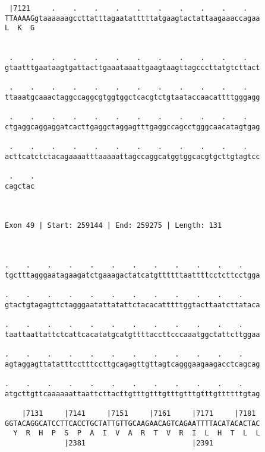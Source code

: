 \documentclass{article}
\begin{document}
\begin{Verbatim}
 |7121     .    .    .    .    .    .    .    .    .    .   
TTAAAAGgtaaaaaagccttatttagaatatttttatgaagtactattaagaaaccagaa
L  K  G                                                     
                                                            
  
 .    .    .    .    .    .    .    .    .    .    .    .   
gtaatttgaataagtgattacttgaaataaattgaagtaagttagcccttatgtcttact
                                                            
 .    .    .    .    .    .    .    .    .    .    .    .   
ttaaatgcaaactaggccaggcgtggtggctcacgtctgtaataccaacattttgggagg
                                                            
 .    .    .    .    .    .    .    .    .    .    .    .   
ctgaggcaggaggatcacttgaggctaggagtttgaggccagcctgggcaacatagtgag
                                                            
 .    .    .    .    .    .    .    .    .    .    .    .   
acttcatctctacagaaaatttaaaaattagccaggcatggtggcacgtgcttgtagtcc
                                                            
 .    .
cagctac
       
       
 
Exon 49 | Start: 259144 | End: 259275 | Length: 131



.    .    .    .    .    .    .    .    .    .    .    .    
tgctttagggaatagaagatctgaaagactatcatgttttttaattttcctcttcctgga
                                                            
.    .    .    .    .    .    .    .    .    .    .    .    
gtactgtagagttctagggaatattatattctacacatttttggtacttaatcttataca
                                                            
.    .    .    .    .    .    .    .    .    .    .    .    
taattaattattctcattcacatatgcatgttttaccttcccaaatggctattcttggaa
                                                            
.    .    .    .    .    .    .    .    .    .    .    .    
agtaggagttatatttcctttccttgcagagttgttagtcagggaagaagacctcagcag
                                                            
.    .    .    .    .    .    .    .    .    .    .    .    
atgcttgttcaaaaaattaattcttacttgtttgtttgtttgtttgtttgttttttgtag
                                                            
    |7131     |7141     |7151     |7161     |7171     |7181 
GGTACAGGCATCCTTCACCTGCTATTGTTGCAAGAACAGTCAGAATTTTACATACACTAC
  Y  R  H  P  S  P  A  I  V  A  R  T  V  R  I  L  H  T  L  L
              |2381                         |2391           
  

\end{Verbatim}
\end{document}
